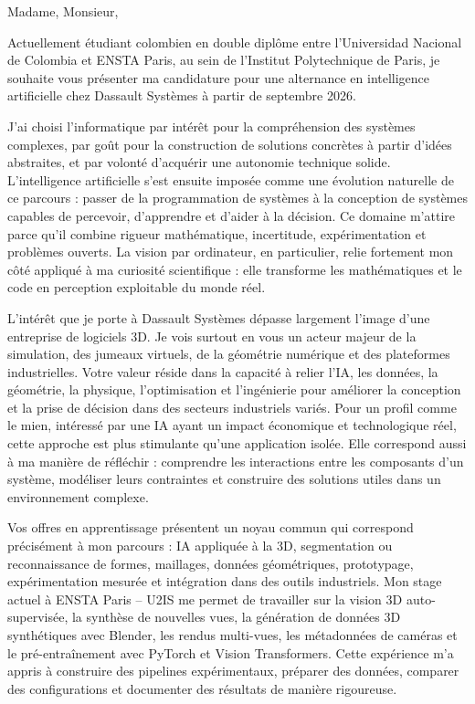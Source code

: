 \documentclass[10pt,a4paper]{article}
\begin{document}
{\small

Madame, Monsieur,

Actuellement étudiant colombien en double diplôme entre l’Universidad Nacional de Colombia et ENSTA Paris, au sein de l’Institut Polytechnique de Paris, je souhaite vous présenter ma candidature pour une alternance en intelligence artificielle chez Dassault Systèmes à partir de septembre 2026.

J’ai choisi l’informatique par intérêt pour la compréhension des systèmes complexes, par goût pour la construction de solutions concrètes à partir d’idées abstraites, et par volonté d’acquérir une autonomie technique solide. L’intelligence artificielle s’est ensuite imposée comme une évolution naturelle de ce parcours : passer de la programmation de systèmes à la conception de systèmes capables de percevoir, d’apprendre et d’aider à la décision. Ce domaine m’attire parce qu’il combine rigueur mathématique, incertitude, expérimentation et problèmes ouverts. La vision par ordinateur, en particulier, relie fortement mon côté appliqué à ma curiosité scientifique : elle transforme les mathématiques et le code en perception exploitable du monde réel.

L’intérêt que je porte à Dassault Systèmes dépasse largement l’image d’une entreprise de logiciels 3D. Je vois surtout en vous un acteur majeur de la simulation, des jumeaux virtuels, de la géométrie numérique et des plateformes industrielles. Votre valeur réside dans la capacité à relier l’IA, les données, la géométrie, la physique, l’optimisation et l’ingénierie pour améliorer la conception et la prise de décision dans des secteurs industriels variés. Pour un profil comme le mien, intéressé par une IA ayant un impact économique et technologique réel, cette approche est plus stimulante qu’une application isolée. Elle correspond aussi à ma manière de réfléchir : comprendre les interactions entre les composants d’un système, modéliser leurs contraintes et construire des solutions utiles dans un environnement complexe.

Vos offres en apprentissage présentent un noyau commun qui correspond précisément à mon parcours : IA appliquée à la 3D, segmentation ou reconnaissance de formes, maillages, données géométriques, prototypage, expérimentation mesurée et intégration dans des outils industriels. Mon stage actuel à ENSTA Paris – U2IS me permet de travailler sur la vision 3D auto-supervisée, la synthèse de nouvelles vues, la génération de données 3D synthétiques avec Blender, les rendus multi-vues, les métadonnées de caméras et le pré-entraînement avec PyTorch et Vision Transformers. Cette expérience m’a appris à construire des pipelines expérimentaux, préparer des données, comparer des configurations et documenter des résultats de manière rigoureuse.

}
\end{document}
